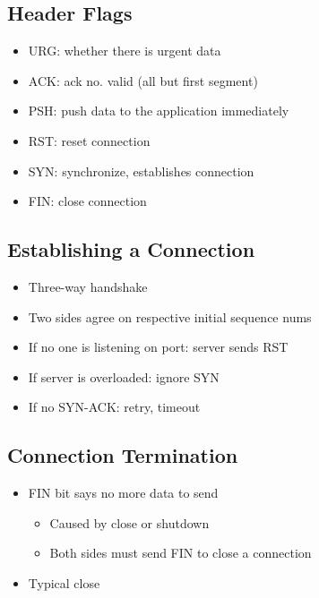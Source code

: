 \subsection{Header Flags}
\begin{itemize}[nosep]
    \item URG: whether there is urgent data
    \item ACK: ack no. valid (all but first segment)
    \item PSH: push data to the application immediately
    \item RST: reset connection
    \item SYN: synchronize, establishes connection
    \item FIN: close connection
\end{itemize}

\subsection{Establishing a Connection}
\begin{itemize}[nosep]
    \item Three-way handshake
    \item Two sides agree on respective initial sequence nums
    \item If no one is listening on port: server sends RST
    \item If server is overloaded: ignore SYN
    \item If no SYN-ACK: retry, timeout
\end{itemize}

\subsection{Connection Termination}
\begin{itemize}[nosep]
    \item FIN bit says no more data to send
          \begin{itemize}[nosep]
              \item Caused by close or shutdown
              \item Both sides must send FIN to close a connection
          \end{itemize}
    \item Typical close
\end{itemize}

